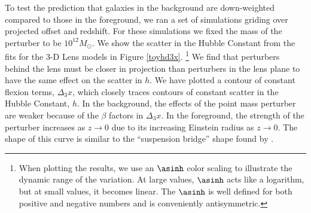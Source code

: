 To test the prediction that galaxies in the background are down-weighted compared to those in the foreground, we ran a set of simulations griding over projected offset and redshift. For these simulations we fixed the mass of the perturber to be $10^{12} M_\odot$. We show the scatter in the Hubble Constant from the fits for the 3-D Lens models in Figure \ref{toyhd3x}. \footnote{When plotting the results, we use an $\asinh$ color scaling to illustrate the dynamic range of the variation. At large values, $\asinh$ acts like a logarithm, but at small values, it becomes linear. The $\asinh$ is well defined for both positive and negative numbers and is conveniently antisymmetric.} We find that perturbers behind the lens must be closer in projection than perturbers in the lens plane to have the same effect on the scatter in $h$. We have plotted a contour of constant flexion terms, $\Delta_3 x$, which closely traces contours of constant scatter in the Hubble Constant, $h$. In the background, the effects of the point mass perturber are weaker because of the $\beta$ factors in $\Delta_3 x$. In the foreground, the strength of the perturber increases as $z \rightarrow 0$ due to its increasing Einstein radius as $z \rightarrow 0$. The shape of this curve is similar to the ``suspension bridge'' shape found by \citet{Momcheva06}.